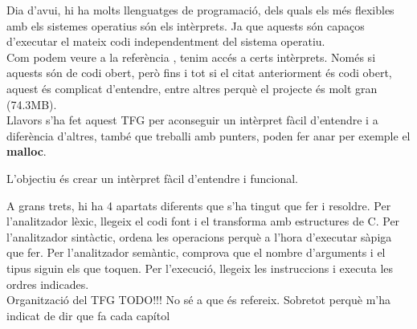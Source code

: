 Dia d'avui, hi ha molts llenguatges de programació,
dels quals els més flexibles amb els sistemes operatius són els intèrprets.
Ja que aquests són capaços d'executar el mateix codi
independentment del sistema operatiu.\\

Com podem veure a la referència \cite{git:cpython},
tenim accés a certs intèrprets.
Només si aquests són de codi obert, però fins i tot si el citat anteriorment és codi obert,
aquest és complicat d'entendre, entre altres perquè el projecte és molt gran (74.3MB).\\

Llavors s'ha fet aquest TFG per aconseguir un intèrpret fàcil d'entendre
i a diferència d'altres, també que treballi amb punters, poden fer anar per exemple el \textbf{malloc}.


%

L'objectiu és crear un intèrpret fàcil d'entendre i funcional.

A grans trets, hi ha 4 apartats diferents que s'ha tingut que fer i resoldre.
Per l'analitzador lèxic, llegeix el codi font i el transforma amb estructures de C.
Per l'analitzador sintàctic, ordena les operacions perquè a l'hora d'executar sàpiga que fer.
Per l'analitzador semàntic, comprova que el nombre d'arguments i el tipus siguin els que toquen.
Per l'execució, llegeix les instruccions i executa les ordres indicades.\\

Organització del TFG TODO!!!
{\color{blue}No sé a que és refereix. Sobretot perquè m'ha indicat de dir que fa cada capítol}
